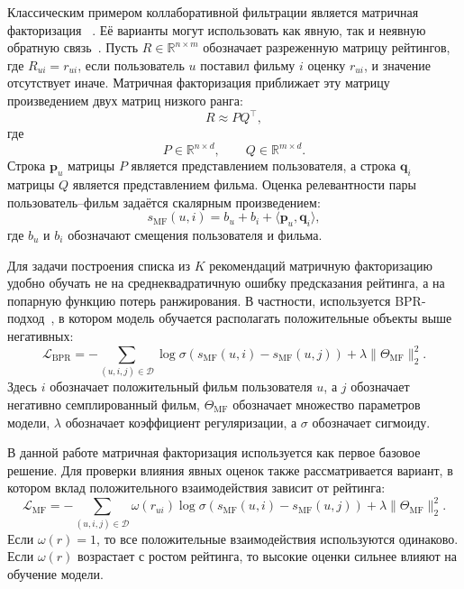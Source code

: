 \documentclass[12pt,fleqn]{article}
\begin{document}
Классическим примером коллаборативной фильтрации является матричная факторизация
~\cite{koren2009matrix}. Её варианты могут использовать как явную, так и неявную обратную связь~\cite{chen2018matrix}. Пусть
$R\in\mathbb{R}^{n\times m}$ обозначает разреженную матрицу рейтингов, где
$R_{ui}=r_{ui}$, если пользователь $u$ поставил фильму $i$ оценку $r_{ui}$,
и значение отсутствует иначе. Матричная факторизация приближает эту матрицу
произведением двух матриц низкого ранга:
$$
    R\approx P Q^{\top},
$$
где
$$
    P\in\mathbb{R}^{n\times d},
    \qquad
    Q\in\mathbb{R}^{m\times d}.
$$
Строка $\mathbf{p}_u$ матрицы $P$ является представлением пользователя, а строка
$\mathbf{q}_i$ матрицы $Q$ является представлением фильма. Оценка релевантности пары
пользователь--фильм задаётся скалярным произведением:
$$
    s_{\mathrm{MF}}(u,i)=
    b_u+b_i+\langle \mathbf{p}_u,\mathbf{q}_i\rangle,
$$
где $b_u$ и $b_i$ обозначают смещения пользователя и фильма.

Для задачи построения списка из $K$ рекомендаций матричную факторизацию удобно обучать не на
среднеквадратичную ошибку предсказания рейтинга, а на попарную функцию потерь
ранжирования. В частности, используется BPR-подход~\cite{rendle2009bpr}, в
котором модель обучается располагать положительные объекты выше негативных:
$$
    \mathcal{L}_{\mathrm{BPR}}=
    -
    \sum_{(u,i,j)\in\mathcal{D}}
    \log\sigma\left(
        s_{\mathrm{MF}}(u,i)-s_{\mathrm{MF}}(u,j)
    \right)
    +
    \lambda\|\Theta_{\mathrm{MF}}\|_2^2.
$$
Здесь $i$ обозначает положительный фильм пользователя $u$, а $j$ обозначает негативно
семплированный фильм, $\Theta_{\mathrm{MF}}$ обозначает множество параметров модели,
$\lambda$ обозначает коэффициент регуляризации, а $\sigma$ обозначает сигмоиду.

В данной работе матричная факторизация используется как первое базовое решение. Для
проверки влияния явных оценок также рассматривается вариант, в котором вклад
положительного взаимодействия зависит от рейтинга:
$$
    \mathcal{L}_{\mathrm{MF}}=
    -
    \sum_{(u,i,j)\in\mathcal{D}}
    \omega(r_{ui})
    \log\sigma\left(
        s_{\mathrm{MF}}(u,i)-s_{\mathrm{MF}}(u,j)
    \right)
    +
    \lambda\|\Theta_{\mathrm{MF}}\|_2^2.
$$
Если $\omega(r)=1$, то все положительные взаимодействия используются одинаково.
Если $\omega(r)$ возрастает с ростом рейтинга, то высокие оценки сильнее влияют
на обучение модели.
\end{document}
